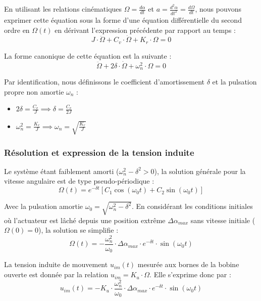 En utilisant les relations cinématiques $\Omega = \frac{d\alpha}{dt}$ et $a = \frac{d^2\alpha}{dt^2} = \frac{d\Omega}{dt}$, nous pouvons exprimer cette équation sous la forme d'une équation différentielle du second ordre en $\Omega(t)$ en dérivant l'expression précédente par rapport au temps :
\begin{equation}
J \cdot \ddot{\Omega} + C_v \cdot \dot{\Omega} + K_r \cdot \Omega = 0
\end{equation}

La forme canonique de cette équation est la suivante :
\begin{equation}
\ddot{\Omega} + 2\delta \cdot \dot{\Omega} + \omega_n^2 \cdot \Omega = 0
\end{equation}

Par identification, nous définissons le coefficient d'amortissement $\delta$ et la pulsation propre non amortie $\omega_n$ :
\begin{itemize}
    \item $2\delta = \frac{C_v}{J} \implies \delta = \frac{C_v}{2J}$
    \item $\omega_n^2 = \frac{K_r}{J} \implies \omega_n = \sqrt{\frac{K_r}{J}}$
\end{itemize}

\subsubsection{Résolution et expression de la tension induite}

Le système étant faiblement amorti ($\omega_n^2 - \delta^2 > 0$), la solution générale pour la vitesse angulaire est de type pseudo-périodique :
\begin{equation}
\Omega(t) = e^{-\delta t} \left[ C_1 \cos(\omega_0 t) + C_2 \sin(\omega_0 t) \right]
\end{equation}

Avec la pulsation amortie $\omega_0 = \sqrt{\omega_n^2 - \delta^2}$. En considérant les conditions initiales où l'actuateur est lâché depuis une position extrême $\Delta\alpha_{max}$ sans vitesse initiale ($\Omega(0) = 0$), la solution se simplifie :
\begin{equation}
\Omega(t) = -\frac{\omega_n^2}{\omega_0} \cdot \Delta\alpha_{max} \cdot e^{-\delta t} \cdot \sin(\omega_0 t)
\end{equation}

La tension induite de mouvement $u_{im}(t)$ mesurée aux bornes de la bobine ouverte est donnée par la relation $u_{im} = K_u \cdot \Omega$. Elle s'exprime donc par :
\begin{equation}
u_{im}(t) = -K_u \cdot \frac{\omega_n^2}{\omega_0} \cdot \Delta\alpha_{max} \cdot e^{-\delta t} \cdot \sin(\omega_0 t)
\end{equation}


